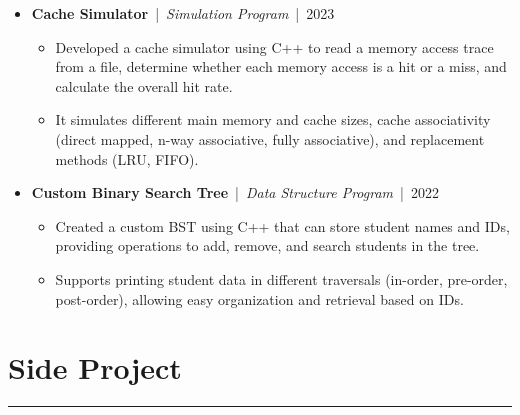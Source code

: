 \documentclass[11pt]{article}
\begin{document}
\begin{itemize}[leftmargin=0pt, label={}, itemsep=0pt,
  topsep=0pt,
  parsep=0pt,
  partopsep=0pt]  %
  \item 
    \textbf{Cache Simulator} \,|\, \textit{Simulation Program} \,|\, 2023
    \begin{itemize}[label=\textbullet, leftmargin=1.5em, itemsep=0pt, topsep=0pt, parsep=0pt, partopsep=0pt]
      \item Developed a cache simulator using C++ to read a memory access trace from a file, 
            determine whether each memory access is a hit or a miss, and calculate the overall hit rate.
      \item It simulates different main memory and cache sizes, cache associativity
            (direct mapped, n-way associative, fully associative), and replacement methods (LRU, FIFO).
    \end{itemize}

  

  \item
    \textbf{Custom Binary Search Tree} \,|\, \textit{Data Structure Program} \,|\, 2022
    \begin{itemize}[label=\textbullet, leftmargin=1.5em, itemsep=0pt, topsep=0pt, parsep=0pt, partopsep=0pt]
      \item Created a custom BST using C++ that can store student names and IDs, providing 
            operations to add, remove, and search students in the tree.
      \item Supports printing student data in different traversals (in-order, pre-order, post-order),
            allowing easy organization and retrieval based on IDs.
    \end{itemize}

  

 

\end{itemize}

\section*{Side Project}
\vspace{-1.0em}
\hrule
\vspace{0.5em}
\end{document}
